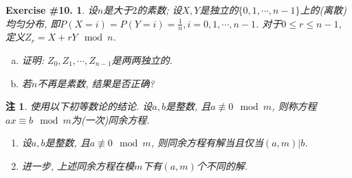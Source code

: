 \documentclass[UTF8, a4paper]{article}
\newtheorem{exercise}{Exercise \#10.}
\newtheorem*{remark}{注}
\begin{document}
\begin{framed}
\begin{exercise}
设\(n\)是大于\(2\)的素数; 设\(X, Y\)是独立的\(\{0,1,\cdots, n-1\}\)上的(离散)均匀分布, 即\(P(X = i) = P(Y = i) = \frac{1}{n}, i = 0,1,\cdots, n-1\).
对于\(0\leq r \leq n-1\), 定义\(Z_r = X+rY \mod n\).
\begin{enumerate}[a)]
    \item 证明: \(Z_0, Z_1, \cdots, Z_{n-1}\)是两两独立的.
    \item 若\(n\)不再是素数, 结果是否正确?
\end{enumerate}
\end{exercise}
\end{framed}

\begin{remark}
使用以下初等数论的结论.
设\(a,b\)是整数, 且\(a \not\equiv 0 \mod m\), 则称方程\(ax \equiv b \mod m\)为(一次)同余方程.
\begin{enumerate}
    \item 设\(a,b\)是整数, 且\(a \not\equiv 0 \mod m\), 则同余方程有解当且仅当\((a,m) | b\).
    \item 进一步, 上述同余方程在模\(m\)下有\((a, m)\)个不同的解.
\end{enumerate}
\end{remark}
\end{document}
